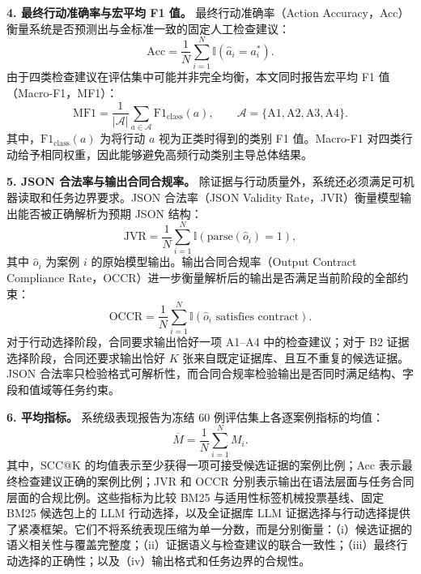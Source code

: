 \textbf{4. 最终行动准确率与宏平均 F1 值。}
最终行动准确率（Action Accuracy，Acc）衡量系统是否预测出与金标准一致的固定人工检查建议：
\begin{equation}
\mathrm{Acc}=
\frac{1}{N}\sum_{i=1}^{N}\mathbb{I}(\hat{a}_i=a^{*}_i).
\label{eq:action-accuracy}
\end{equation}
由于四类检查建议在评估集中可能并非完全均衡，本文同时报告宏平均 F1 值（Macro-F1，MF1）：
\begin{equation}
\mathrm{MF1}=
\frac{1}{|\mathcal{A}|}\sum_{a\in\mathcal{A}}\mathrm{F1}_{\mathrm{class}}(a),
\qquad
\mathcal{A}=\{\mathrm{A1},\mathrm{A2},\mathrm{A3},\mathrm{A4}\}.
\label{eq:macro-f1}
\end{equation}
其中，\(\mathrm{F1}_{\mathrm{class}}(a)\) 为将行动 \(a\) 视为正类时得到的类别 F1 值。Macro-F1 对四类行动给予相同权重，因此能够避免高频行动类别主导总体结果。

\textbf{5. JSON 合法率与输出合同合规率。}
除证据与行动质量外，系统还必须满足可机器读取和任务边界要求。JSON 合法率（JSON Validity Rate，JVR）衡量模型输出能否被正确解析为预期 JSON 结构：
\begin{equation}
\mathrm{JVR}=
\frac{1}{N}\sum_{i=1}^{N}\mathbb{I}(\mathrm{parse}(\hat{o}_i)=1),
\label{eq:json-validity}
\end{equation}
其中 \(\hat{o}_i\) 为案例 \(i\) 的原始模型输出。输出合同合规率（Output Contract Compliance Rate，OCCR）进一步衡量解析后的输出是否满足当前阶段的全部约束：
\begin{equation}
\mathrm{OCCR}=
\frac{1}{N}\sum_{i=1}^{N}\mathbb{I}(\hat{o}_i\text{ satisfies contract}).
\label{eq:contract-compliance}
\end{equation}
对于行动选择阶段，合同要求输出恰好一项 A1--A4 中的检查建议；对于 B2 证据选择阶段，合同还要求输出恰好 \(K\) 张来自既定证据库、且互不重复的候选证据。JSON 合法率只检验格式可解析性，而合同合规率检验输出是否同时满足结构、字段和值域等任务约束。

\textbf{6. 平均指标。}
系统级表现报告为冻结 60 例评估集上各逐案例指标的均值：
\begin{equation}
\overline{M}=\frac{1}{N}\sum_{i=1}^{N}M_i.
\label{eq:mean-metric}
\end{equation}
其中，SCC@K 的均值表示至少获得一项可接受候选证据的案例比例；Acc 表示最终检查建议正确的案例比例；JVR 和 OCCR 分别表示输出在语法层面与任务合同层面的合规比例。这些指标为比较 BM25 与适用性标签机械投票基线、固定 BM25 候选包上的 LLM 行动选择，以及全证据库 LLM 证据选择与行动选择提供了紧凑框架。它们不将系统表现压缩为单一分数，而是分别衡量：（i）候选证据的语义相关性与覆盖完整度；（ii）证据语义与检查建议的联合一致性；（iii）最终行动选择的正确性；以及（iv）输出格式和任务边界的合规性。

